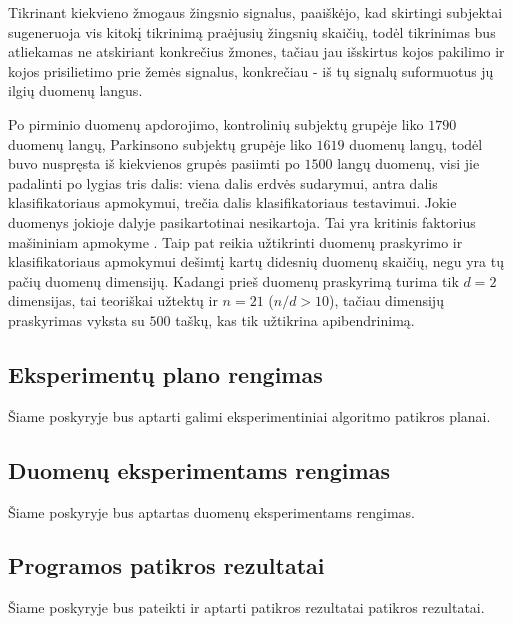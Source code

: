 \documentclass[]{vgtuef}
\begin{document}
Tikrinant kiekvieno žmogaus žingsnio signalus, paaiškėjo, kad
skirtingi subjektai sugeneruoja vis kitokį tikrinimą praėjusių
žingsnių skaičių, todėl tikrinimas bus atliekamas ne atskiriant
konkrečius žmones, tačiau jau išskirtus kojos pakilimo ir kojos
prisilietimo prie žemės signalus, konkrečiau - iš tų signalų
suformuotus jų ilgių duomenų langus.

Po pirminio duomenų apdorojimo, kontrolinių subjektų grupėje liko
$1790$ duomenų langų, Parkinsono subjektų grupėje liko $1619$ duomenų
langų, todėl buvo nuspręsta iš kiekvienos grupės pasiimti po $1500$
langų duomenų, visi jie padalinti po lygias tris dalis: viena dalis
erdvės sudarymui, antra dalis klasifikatoriaus apmokymui, trečia dalis
klasifikatoriaus testavimui. Jokie duomenys jokioje dalyje
pasikartotinai nesikartoja. Tai yra kritinis faktorius mašininiam
apmokyme \cite{824819}. Taip pat reikia užtikrinti duomenų praskyrimo
ir klasifikatoriaus apmokymui dešimtį kartų didesnių duomenų skaičių,
negu yra tų pačių duomenų dimensijų. Kadangi prieš duomenų praskyrimą
turima tik $d=2$ dimensijas, tai teoriškai užtektų ir $n=21$ ($n/d >
10$), tačiau dimensijų praskyrimas vyksta su $500$ taškų, kas tik
užtikrina apibendrinimą. 

\subsection{Eksperimentų plano rengimas}

Šiame poskyryje bus aptarti galimi eksperimentiniai algoritmo patikros
planai. 


\subsection{Duomenų eksperimentams rengimas}

Šiame poskyryje bus aptartas duomenų eksperimentams rengimas.


\subsection{Programos patikros rezultatai}


Šiame poskyryje bus pateikti ir aptarti patikros rezultatai patikros
rezultatai.
\end{document}
